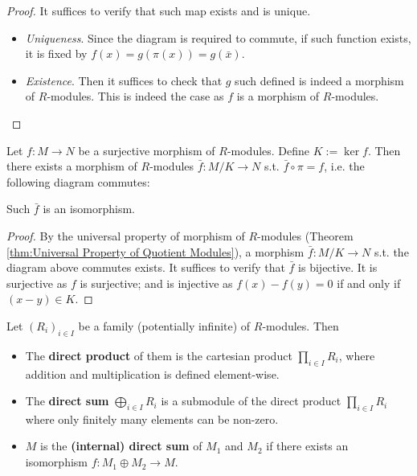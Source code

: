 \begin{proof}
    It suffices to verify that such map exists and is unique.
    \begin{itemize}
        \item \emph{Uniqueness}. Since the diagram is required to commute, if such function exists, it is fixed by $f(x) = g(\pi(x)) = g(\bar{x})$.
        \item \emph{Existence}. Then it suffices to check that $g$ such defined is indeed a morphism of $R$-modules. This is indeed the case as $f$ is a morphism of $R$-modules.
    \end{itemize}
\end{proof}

\begin{theorem}\label{thm:First Isomorphism Theorem}
    Let $f: M\to N$ be a surjective morphism of $R$-modules. Define $K := \ker f$. Then there exists a morphism of $R$-modules $\bar{f}: M/K\to N$ s.t. $\bar{f}\circ \pi = f$, i.e. the following diagram commutes:
    
    \begin{minipage}{\linewidth}
        \centering
    \end{minipage}

    Such $\bar{f}$ is an isomorphism.
\end{theorem}

\begin{proof}
    By the universal property of morphism of $R$-modules (Theorem \ref{thm:Universal Property of Quotient Modules}), a morphism $\bar{f}: M/K\to N$ s.t. the diagram above commutes exists. It suffices to verify that $\bar{f}$ is bijective. It is surjective as $f$ is surjective; and is injective as $f(x) - f(y) = 0$ if and only if $(x - y)\in K$.
\end{proof}

\begin{definition}
    Let $(R_i)_{i\in I}$ be a family (potentially infinite) of $R$-modules. Then
    \begin{itemize}
        \item The \textbf{direct product} of them is the cartesian product $\prod_{i\in I} R_i$, where addition and multiplication is defined element-wise.
        \item The \textbf{direct sum} $\bigoplus_{i\in I} R_i$ is a submodule of the direct product $\prod_{i\in I} R_i$ where only finitely many elements can be non-zero.
        \item $M$ is the \textbf{(internal) direct sum} of $M_1$ and $M_2$ if there exists an isomorphism $f: M_1 \oplus M_2 \to M$.
    \end{itemize}
\end{definition}

